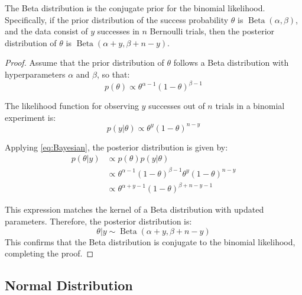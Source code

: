 \begin{theorem}
	The Beta distribution is the conjugate prior for the binomial likelihood. Specifically, if the prior distribution of the success probability $\theta$ is $\operatorname{Beta}(\alpha, \beta)$, and the data consist of $y$ successes in $n$ Bernoulli trials, then the posterior distribution of $\theta$ is $\operatorname{Beta}(\alpha + y, \beta + n - y)$.
\end{theorem}
\begin{proof}
	Assume that the prior distribution of $\theta$ follows a Beta distribution with hyperparameters $\alpha$ and $\beta$, so that:
	\[
	p(\theta) \propto \theta^{\alpha - 1} (1 - \theta)^{\beta - 1}
	\]
	
	The likelihood function for observing $y$ successes out of $n$ trials in a binomial experiment is:
	\[
	p(y | \theta) \propto \theta^y (1 - \theta)^{n - y}
	\]
	
	Applying \cref{eq:Bayesian}, the posterior distribution is given by:
	\begin{align*}
		p(\theta | y) &\propto p(\theta)p(y | \theta) \\
		&\propto \theta^{\alpha - 1} (1 - \theta)^{\beta - 1}\theta^y (1 - \theta)^{n - y}  \\
		&\propto \theta^{\alpha + y - 1} (1 - \theta)^{\beta + n - y - 1}
	\end{align*}
	
	This expression matches the kernel of a Beta distribution with updated parameters. Therefore, the posterior distribution is:
	\[
	\theta | y \sim \operatorname{Beta}(\alpha + y, \beta + n - y)
	\]
	This confirms that the Beta distribution is conjugate to the binomial likelihood, completing the proof.
\end{proof}

\subsection{Normal Distribution}
